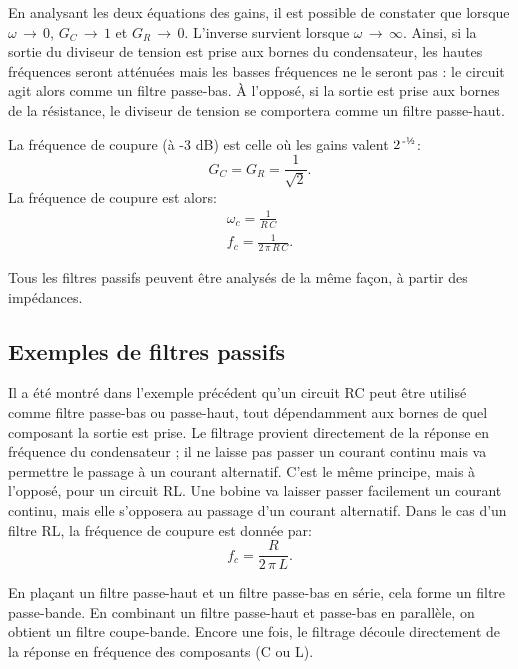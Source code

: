 \documentclass[canadien,12pt,oneside,letterpaper]{article}
\begin{document}
En analysant les deux équations des gains, il est possible de constater que lorsque $\omega\,\rightarrow\,0$, $G_C\,\rightarrow\,1$ et $G_R\,\rightarrow\,0$. L'inverse survient lorsque $\omega\,\rightarrow\,\infty$. Ainsi, si la sortie du diviseur de tension est prise aux bornes du condensateur, les hautes fréquences seront atténuées mais les basses fréquences ne le seront pas : le circuit agit alors comme un filtre passe-bas. À l'opposé, si la sortie est prise aux bornes de la résistance, le diviseur de tension se comportera comme un filtre passe-haut.

La fréquence de coupure (à -3 dB) est celle où les gains valent $2^{\,\text{-\textonehalf}}$:
\begin{equation}
G_C=G_R=\frac{1}{\sqrt{2}}.
\end{equation}
La fréquence de coupure est alors:
\begin{subequations}
\begin{gather}
\omega_c=\frac{1}{R\,C}\\
f_c=\frac{1}{2\,\pi\,R\,C}.
\end{gather}
\end{subequations}

Tous les filtres passifs peuvent être analysés de la même façon, à partir des impédances.


\subsection{Exemples de filtres passifs}

Il a été montré dans l'exemple précédent qu'un circuit RC peut être utilisé comme filtre passe-bas ou passe-haut, tout dépendamment aux bornes de quel composant la sortie est prise. Le filtrage provient directement de la réponse en fréquence du condensateur ; il ne laisse pas passer un courant continu mais va permettre le passage à un courant alternatif. C'est le même principe, mais à l'opposé, pour un circuit RL. Une bobine va laisser passer facilement un courant continu, mais elle s'opposera au passage d'un courant alternatif. Dans le cas d'un filtre RL, la fréquence de coupure est donnée par:
\begin{equation}
f_c=\frac{R}{2\,\pi\,L}.
\end{equation}

En plaçant un filtre passe-haut et un filtre passe-bas en série, cela forme un filtre passe-bande. En combinant un filtre passe-haut et passe-bas en parallèle, on obtient un filtre coupe-bande. Encore une fois, le filtrage découle directement de la réponse en fréquence des composants (C ou L).
\end{document}
